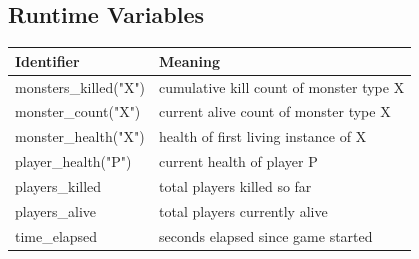 \documentclass[12pt,a4paper]{article}
\begin{document}
\subsection{Runtime Variables}
\begin{longtable}{>{\ttfamily}p{5.2cm} p{8.3cm}}
\toprule
\normalfont\textbf{Identifier} & \textbf{Meaning} \\
\midrule
monsters\_killed("X") & cumulative kill count of monster type X \\
monster\_count("X")   & current alive count of monster type X \\
monster\_health("X")  & health of first living instance of X \\
player\_health("P")   & current health of player P \\
players\_killed       & total players killed so far \\
players\_alive        & total players currently alive \\
time\_elapsed         & seconds elapsed since game started \\
\bottomrule
\end{longtable}
\end{document}
